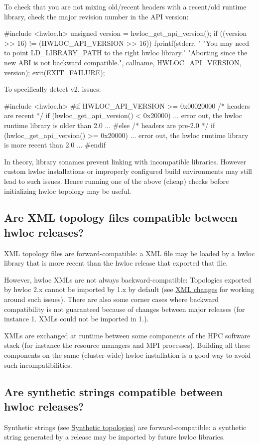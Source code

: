 To check that you are not mixing old/recent headers with a recent/old runtime library, check the major revision number in the A\+PI version\+: \begin{DoxyVerb}#include <hwloc.h>
  unsigned version = hwloc_get_api_version();
  if ((version >> 16) != (HWLOC_API_VERSION >> 16)) {
    fprintf(stderr,
           "%
           "You may need to point LD_LIBRARY_PATH to the right hwloc library.\n"
           "Aborting since the new ABI is not backward compatible.\n",
           callname, HWLOC_API_VERSION, version);
    exit(EXIT_FAILURE);
  }
\end{DoxyVerb}
 To specifically detect v2. issues\+: \begin{DoxyVerb}#include <hwloc.h>
#if HWLOC_API_VERSION >= 0x00020000
  /* headers are recent */
  if (hwloc_get_api_version() < 0x20000)
    ... error out, the hwloc runtime library is older than 2.0 ...
#else
  /* headers are pre-2.0 */
  if (hwloc_get_api_version() >= 0x20000)
    ... error out, the hwloc runtime library is more recent than 2.0 ...
#endif
\end{DoxyVerb}


In theory, library sonames prevent linking with incompatible libraries. However custom hwloc installations or improperly configured build environments may still lead to such issues. Hence running one of the above (cheap) checks before initializing hwloc topology may be useful.\hypertarget{a00394_faq_version_xml}{}\subsection{Are X\+M\+L topology files compatible between hwloc releases?}\label{a00394_faq_version_xml}
X\+ML topology files are forward-\/compatible\+: a X\+ML file may be loaded by a hwloc library that is more recent than the hwloc release that exported that file.

However, hwloc X\+M\+Ls are not always backward-\/compatible\+: Topologies exported by hwloc 2.\+x cannot be imported by 1.\+x by default (see \hyperlink{a00395_upgrade_to_api_2x_xml}{X\+ML changes} for working around such issues). There are also some corner cases where backward compatibility is not guaranteed because of changes between major releases (for instance 1. X\+M\+Ls could not be imported in 1.).

X\+M\+Ls are exchanged at runtime between some components of the H\+PC software stack (for instance the resource managers and M\+PI processes). Building all these components on the same (cluster-\/wide) hwloc installation is a good way to avoid such incompatibilities.\hypertarget{a00394_faq_version_synthetic}{}\subsection{Are synthetic strings compatible between hwloc releases?}\label{a00394_faq_version_synthetic}
Synthetic strings (see \hyperlink{a00389}{Synthetic topologies}) are forward-\/compatible\+: a synthetic string generated by a release may be imported by future hwloc libraries.

